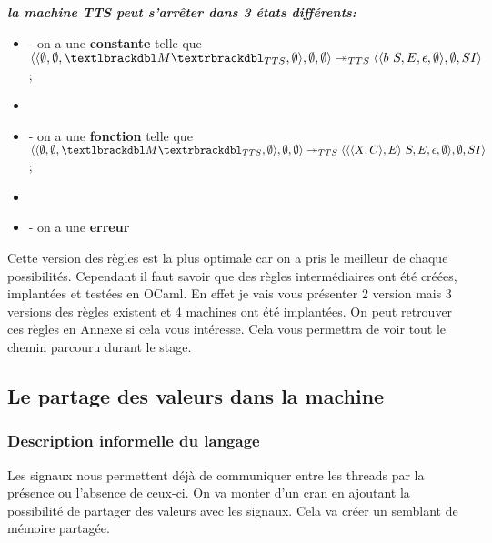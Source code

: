 \documentclass[10pt,a4paper]{article}
\begin{document}
				\bigbreak
				\bigbreak
					
					
					
					
				\textbf{\textit{la machine TTS peut s'arrêter dans 3 états différents:}}
				\smallbreak
				\begin{itemize}
					\item[] - on a une \textbf{constante} telle que 
					$\langle\langle \emptyset,\emptyset,\textlbrackdbl M\textrbrackdbl_{TTS},\emptyset\rangle,\emptyset,\emptyset\rangle 
					\twoheadrightarrow_{TTS} 
					\langle\langle b~S,E,\epsilon,\emptyset\rangle,\emptyset,SI\rangle$;
					\item[] 
				    
				    \item[] - on a une \textbf{fonction} telle que
					$\langle\langle \emptyset,\emptyset,\textlbrackdbl M\textrbrackdbl_{TTS},\emptyset\rangle,\emptyset,\emptyset\rangle 
					\twoheadrightarrow_{TTS} 
					\langle\langle\langle X,C\rangle,E\rangle~S,E,\epsilon,\emptyset\rangle,\emptyset,SI\rangle$;
					\item[] 
			
					\item[] - on a une \textbf{erreur} 
				\end{itemize}
				\bigbreak
				\bigbreak
					
					
					
					
				Cette version des règles est la plus optimale car on a pris le meilleur de chaque possibilités. Cependant il faut savoir que des règles intermédiaires ont été créées, implantées et testées en OCaml. En effet je vais vous présenter 2 version mais 3 versions des règles existent et 4 machines ont été implantées. On peut retrouver ces règles en Annexe si cela vous intéresse. Cela vous permettra de voir tout le chemin parcouru durant le stage.
				\newpage
					
					
		\subsection{Le partage des valeurs dans la machine}
			
			\subsubsection{Description informelle du langage}
				Les signaux nous permettent déjà de communiquer entre les threads par la présence ou l'absence de ceux-ci. On va monter d'un cran en ajoutant la possibilité de partager des valeurs avec les signaux. Cela va créer un semblant de mémoire partagée.
				\medbreak
				
\end{document}
